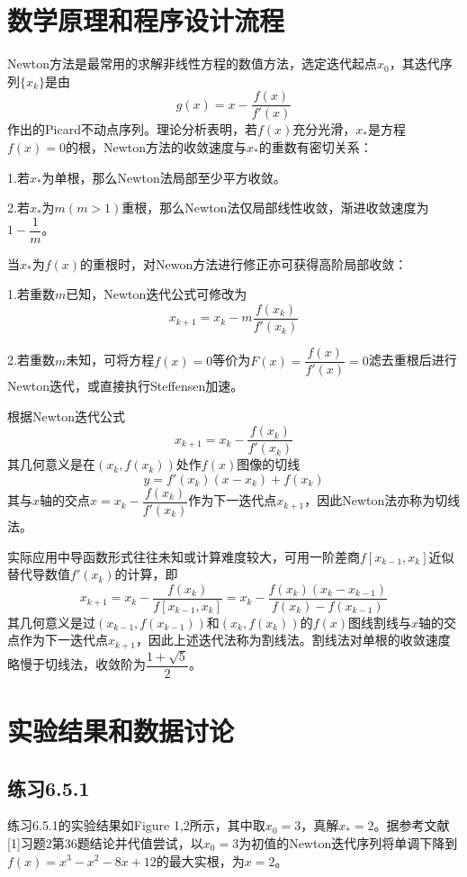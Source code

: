 \documentclass[UTF8,a4paper,10pt]{ctexart}
\begin{document}
    \section{数学原理和程序设计流程}
        \par
        Newton方法是最常用的求解非线性方程的数值方法，选定迭代起点$x_0$，其迭代序列$\{x_k\}$是由
        $$
        g(x)=x-\dfrac{f(x)}{f'(x)}
        $$
        作出的Picard不动点序列。理论分析表明，若$f(x)$充分光滑，$x_*$是方程$f(x)=0$的根，Newton方法的收敛速度与$x_*$的重数有密切关系：
        \par
        1.若$x_*$为单根，那么Newton法局部至少平方收敛。
        \par
        2.若$x_*$为$m(m>1)$重根，那么Newton法仅局部线性收敛，渐进收敛速度为$1-\dfrac{1}{m}$。
        \par
        当$x_*$为$f(x)$的重根时，对Newon方法进行修正亦可获得高阶局部收敛：
        \par
        1.若重数$m$已知，Newton迭代公式可修改为
        $$
        x_{k+1}=x_k-m\dfrac{f(x_k)}{f'(x_k)}
        $$
        \par
        2.若重数$m$未知，可将方程$f(x)=0$等价为$F(x)=\dfrac{f(x)}{f'(x)}=0$滤去重根后进行Newton迭代，或直接执行Steffensen加速。
        \par
        根据Newton迭代公式
        $$
        x_{k+1}=x_k-\dfrac{f(x_k)}{f'(x_k)}
        $$
        其几何意义是在$\left(x_k,f(x_k)\right)$处作$f(x)$图像的切线
        $$
        y=f'(x_k)(x-x_k)+f(x_k)
        $$
        其与$x$轴的交点$x=x_k-\dfrac{f(x_k)}{f'(x_k)}$作为下一迭代点$x_{k+1}$，因此Newton法亦称为切线法。
        \par
        实际应用中导函数形式往往未知或计算难度较大，可用一阶差商$f[x_{k-1},x_k]$近似替代导数值$f'(x_k)$的计算，即
        $$
        x_{k+1}=x_k-\dfrac{f(x_k)}{f\left[x_{k-1},x_k\right]}=x_k-\dfrac{f(x_k)\left(x_k-x_{k-1}\right)}{f(x_k)-f(x_{k-1})}
        $$
        其几何意义是过$\left(x_{k-1},f(x_{k-1})\right)$和$\left(x_k,f(x_k)\right)$的$f(x)$图线割线与$x$轴的交点作为下一迭代点$x_{k+1}$，因此上述迭代法称为割线法。割线法对单根的收敛速度略慢于切线法，收敛阶为$\dfrac{1+\sqrt{5}}{2}$。
        
\section{实验结果和数据讨论}
    \subsection{练习6.5.1}
        \par
        练习6.5.1的实验结果如Figure 1,2所示，其中取$x_0=3$，真解$x_*=2$。据参考文献[1]习题2第36题结论并代值尝试，以$x_0=3$为初值的Newton迭代序列将单调下降到$f(x)=x^3-x^2-8x+12$的最大实根，为$x=2$。
\end{document}

